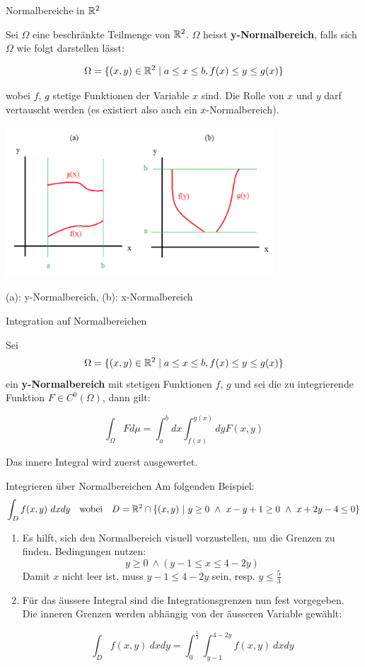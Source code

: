 \begin{Definition}{Normalbereiche in $\mathbb{R}^2$}{}

Sei $\Omega$ eine beschränkte Teilmenge von $\mathbb{R}^2$. $\Omega$ heisst \textbf{y-Normalbereich}, falls sich $\Omega$ wie folgt darstellen lässt:

\[
    \Omega = \{(x, y) \in \mathbb{R}^2 \mid a \leq x \leq b, f(x) \leq y \leq g(x)\}
\]

wobei $f$, $g$ stetige Funktionen der Variable $x$ sind. Die Rolle von $x$ und $y$ darf vertauscht werden (es existiert also auch ein $x$-Normalbereich).

\includegraphics[width=10cm]{images/normalbereich}

(a): y-Normalbereich, (b): x-Normalbereich

\end{Definition}
\begin{Satz}{Integration auf Normalbereichen}{}

Sei \[\Omega = \{(x, y) \in \mathbb{R}^2 \mid a \leq x \leq b, f(x) \leq y \leq g(x)\}\] ein \textbf{y-Normalbereich} mit stetigen Funktionen $f$, $g$ und sei die zu integrierende Funktion $F \in C^0(\Omega)$, dann gilt:

\[
    \int_{\Omega} F d\mu = \int_a^b dx \int_{f(x)}^{g(x)} dy F(x, y)
\]

Das innere Integral wird zuerst ausgewertet.
\end{Satz}

\begin{Rezept}{Integrieren über Normalbereichen}{}
Am folgenden Beispiel:
\[ \int_D f(x, y) ~ dx dy ~~ \text{ wobei } ~~ D = \mathbb{R}^2 \cap \{(x, y) ~ | ~ y \geq 0 ~ \wedge ~ x-y+1\geq 0 ~ \wedge ~ x+2y-4 \leq 0\}\]
\begin{enumerate}
\item {
Es hilft, sich den Normalbereich visuell vorzustellen, um die Grenzen
zu finden. Bedingungen nutzen:
\[ y \geq 0 ~ \wedge (y-1 \leq x \leq 4-2y) \]
Damit $x$ nicht leer ist, muss $y-1 \leq 4-2y$ sein, resp. $y \leq \frac{5}{3}$ 
}
\item {
Für das äussere Integral sind die Integrationsgrenzen nun fest vorgegeben. Die inneren Grenzen
werden abhängig von der äusseren Variable gewählt:

\[ \int_D f(x,y) ~ dx dy = \int_0^{\frac{5}{3}} \int_{y-1}^{4-2y} f(x,y) ~ dx dy \]

}
\end{enumerate}
\end{Rezept}


